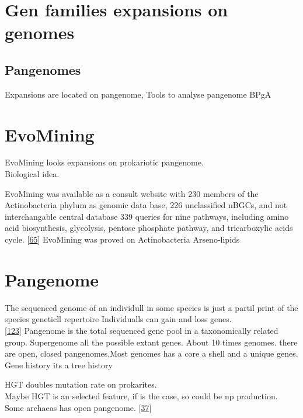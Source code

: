 \documentclass[12pt,twoside]{reedthesis}
\begin{document}
  \section{Gen families expansions on
  genomes}\label{gen-families-expansions-on-genomes}
  
  \subsection{Pangenomes}\label{pangenomes}
  
  Expansions are located on pangenome, Tools to analyse pangenome BPgA
  
  \section{EvoMining}\label{evomining-1}
  
  EvoMining looks expansions on prokariotic pangenome.\\
  Biological idea.
  
  EvoMining was available as a consult website with 230 members of the
  Actinobacteria phylum as genomic data base, 226 unclassified nBGCs, and
  not interchangable central database 339 queries for nine pathways,
  including amino acid biosynthesis, glycolysis, pentose phosphate
  pathway, and tricarboxylic acids cycle.
  {[}\protect\hyperlink{ref-cruz-moralesux5fphylogenomicux5f2016}{65}{]}
  EvoMining was proved on Actinobacteria Arseno-lipids
  
  \section{Pangenome}\label{pangenome}
  
  The sequenced genome of an individull in some species is just a partil
  print of the species geneticll repertoire Individualls can gain and loss
  genes.\\
  {[}\protect\hyperlink{ref-kooninux5fturbulentux5f2015}{123}{]} Pangenome
  is the total sequenced gene pool in a taxonomically related group.
  Supergenome all the possible extant genes. About 10 times genomes. there
  are open, closed pangenomes.Most genomes has a core a shell and a unique
  genes.\\
  Gene history its a tree history
  
  HGT doubles mutation rate on prokarites.\\
  Maybe HGT is an selected feature, if is the case, so could be np
  production.\\
  Some archaeas has open pangenome.
  {[}\protect\hyperlink{ref-halachevux5fcalculatingux5f2011}{37}{]}
  
\end{document}
